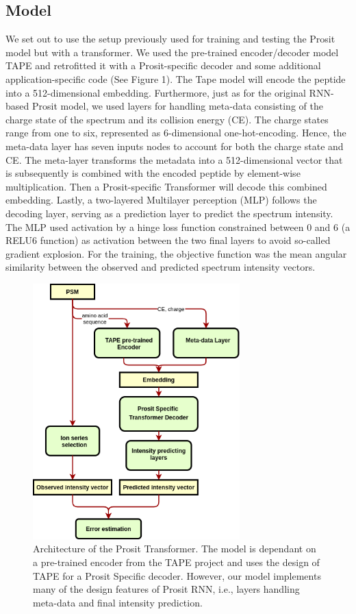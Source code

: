 \documentclass[10pt,a4paper]{article}
\begin{document}
\subsection*{Model}
We set out to use the setup previously used for training and testing the Prosit model but with a transformer. We used the pre-trained encoder/decoder model TAPE \cite{Rao2019-qq} and retrofitted it with a Prosit-specific decoder and some additional application-specific code (See Figure 1). The Tape model will encode the peptide into a 512-dimensional embedding. Furthermore, just as for the original RNN-based Prosit model, we used layers for handling meta-data consisting of the charge state of the spectrum and its collision energy (CE). The charge states range from one to six, represented as 6-dimensional one-hot-encoding. Hence, the meta-data layer has seven inputs nodes to account for both the charge state and CE. The meta-layer transforms the metadata into a 512-dimensional vector that is subsequently is combined with the encoded peptide by element-wise multiplication. Then a Prosit-specific Transformer will decode this combined embedding. Lastly, a two-layered Multilayer perception (MLP) follows the decoding layer, serving as a prediction layer to predict the spectrum intensity. The MLP used activation by a hinge loss function constrained between 0 and 6 (a RELU6 function) as activation between the two final layers to avoid so-called gradient explosion. For the training, the objective function was the mean angular similarity between the observed and predicted spectrum intensity vectors.


\begin{figure}[htb]
\includegraphics[width=8cm]{./figures/Architecture.png}
\caption{Architecture of the Prosit Transformer. The model is dependant on a pre-trained encoder from the TAPE project and uses the design of TAPE for a Prosit Specific decoder. However, our model implements many of the design features of Prosit RNN, i.e., layers handling meta-data and final intensity prediction.}
\end{figure}
\end{document}
